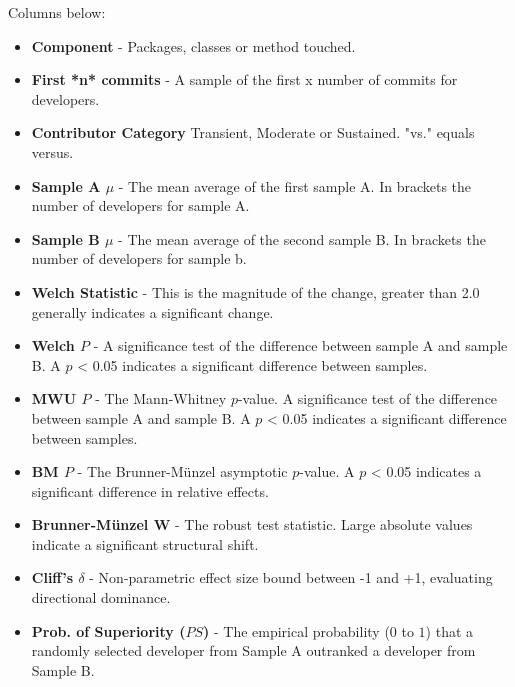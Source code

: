 Columns below:  
\begin{itemize}
                    \item{\textbf{Component} - Packages, classes or method touched.}
                    \item{\textbf{First *n* commits} - A sample of the first x number of commits for developers. }
                    \item{\textbf{Contributor Category} Transient, Moderate or Sustained. "vs." equals versus.}
                    \item{\textbf{Sample A $\mu$} - The mean average of the first sample A. In brackets the number of developers for sample A. }
                    \item{\textbf{Sample B $\mu$} - The mean average of the second sample B. In brackets the number of developers for sample b.}
                    \item{\textbf{Welch Statistic} - This is the magnitude of the change, greater than 2.0 generally indicates a significant change. }
                    \item{\textbf{Welch $P$} - A significance test of the difference between sample A and sample B. A $p$ \textless{} 0.05 indicates a significant difference between samples. }
                    \item{\textbf{MWU $P$} - The Mann-Whitney $p$-value. A significance test of the difference between sample A and sample B. A $p$ \textless{} 0.05 indicates a significant difference between samples.} 
                    \item{\textbf{BM $P$} - The Brunner-Münzel asymptotic $p$-value. A $p$ \textless{} 0.05 indicates a significant difference in relative effects.}
                    \item{\textbf{Brunner-Münzel W} - The robust test statistic. Large absolute values indicate a significant structural shift.} 
                    \item{\textbf{Cliff's $\delta$} - Non-parametric effect size bound between -1 and +1, evaluating directional dominance.}
                    \item{\textbf{Prob. of Superiority ($PS$)} - The empirical probability ($0$ to $1$) that a randomly selected developer from Sample A outranked a developer from Sample B.} 
                \end{itemize}
    






